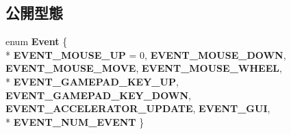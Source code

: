 \subsection*{公開型態}
\begin{DoxyCompactItemize}
\item 
enum {\bfseries Event} \{ \\*
{\bfseries E\+V\+E\+N\+T\+\_\+\+M\+O\+U\+S\+E\+\_\+\+UP} = 0, 
{\bfseries E\+V\+E\+N\+T\+\_\+\+M\+O\+U\+S\+E\+\_\+\+D\+O\+WN}, 
{\bfseries E\+V\+E\+N\+T\+\_\+\+M\+O\+U\+S\+E\+\_\+\+M\+O\+VE}, 
{\bfseries E\+V\+E\+N\+T\+\_\+\+M\+O\+U\+S\+E\+\_\+\+W\+H\+E\+EL}, 
\\*
{\bfseries E\+V\+E\+N\+T\+\_\+\+G\+A\+M\+E\+P\+A\+D\+\_\+\+K\+E\+Y\+\_\+\+UP}, 
{\bfseries E\+V\+E\+N\+T\+\_\+\+G\+A\+M\+E\+P\+A\+D\+\_\+\+K\+E\+Y\+\_\+\+D\+O\+WN}, 
{\bfseries E\+V\+E\+N\+T\+\_\+\+A\+C\+C\+E\+L\+E\+R\+A\+T\+O\+R\+\_\+\+U\+P\+D\+A\+TE}, 
{\bfseries E\+V\+E\+N\+T\+\_\+\+G\+UI}, 
\\*
{\bfseries E\+V\+E\+N\+T\+\_\+\+N\+U\+M\+\_\+\+E\+V\+E\+NT}
 \}\hypertarget{class_magnum_1_1_input_a18d89185afbcdf49e062b4eaae8fe9b1}{}\label{class_magnum_1_1_input_a18d89185afbcdf49e062b4eaae8fe9b1}


\end{DoxyCompactItemize}
